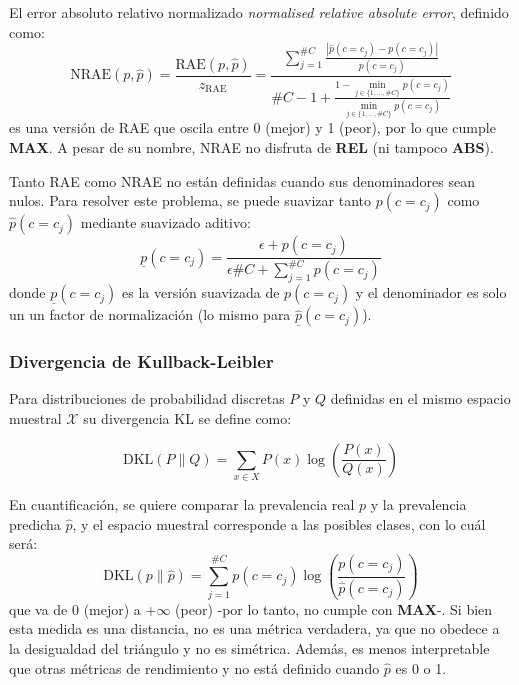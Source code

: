 El error absoluto relativo normalizado {\it normalised relative absolute error},
definido como:
\begin{equation}
    {\text{NRAE}(p, \hat p)} = \frac{\text{RAE}(p, \hat p)}{z_{\text{RAE}}} = \frac{\sum \limits_{j=1}^{\#C}{\frac{|\hat p(c=c_j) - p(c=c_j)|}{p(c=c_j)}}}{\#C - 1 + \frac {1 - \displaystyle \min_{j\in\{1,\dots,\#C\}}p(c=c_j)}{\displaystyle \min_{j\in\{1,\dots,\#C\}}p(c=c_j)}}
\end{equation}
es una versión de RAE que oscila entre 0 (mejor) y 1 (peor), por lo que cumple
{\bf MAX}. A pesar de su nombre, NRAE no disfruta de {\bf REL} (ni tampoco {\bf
ABS}).

Tanto RAE como NRAE no están definidas cuando sus denominadores sean nulos. Para
resolver este problema, se puede suavizar tanto $p(c=c_j)$ como $\hat p(c=c_j)$
mediante suavizado aditivo:
\begin{equation}
    \underline p(c=c_j) = \frac{\epsilon + p(c=c_j)}{\epsilon  \#C + \sum \limits_{j=1}^{\#C}{p(c=c_j)}}
\end{equation}
donde $\underline p(c=c_j)$ es la versión suavizada de $p(c=c_j)$ y el
denominador es solo un un factor de normalización (lo mismo para $\underline
{\hat p}(c=c_j)$).

\subsubsection{Divergencia de Kullback-Leibler}\label{evaluacion:dkl}

Para distribuciones de probabilidad discretas $P$ y $Q$ definidas en el mismo
espacio muestral ${\mathcal {X}}$ su divergencia KL se define como:

\begin{equation}
    {\text{DKL}}(P\parallel Q)=\sum \limits_{x\in {X}}P(x)\log \left({\frac {P(x)}{Q(x)}}\right)
\end{equation}

En cuantificación, se quiere comparar la prevalencia real $p$ y la prevalencia
predicha $\hat{p}$, y el espacio muestral corresponde a las posibles clases, con
lo cuál será:
\begin{equation}
    {\text{DKL}}(p\parallel \hat{p}) = \sum \limits_{j=1}^{\#C}p(c=c_j)\log \left({\frac {p(c=c_j)}{\hat p(c=c_j)}}\right)
\end{equation}
que va de {0} (mejor) a {+$\infty$} (peor) -por lo tanto, no cumple con {\bf
MAX}-. Si bien esta medida es una distancia, no es una métrica verdadera, ya que
no obedece a la desigualdad del triángulo y no es simétrica. Además, es menos
interpretable que otras métricas de rendimiento y no está definido cuando
$\hat{p}$ es 0 o 1.

